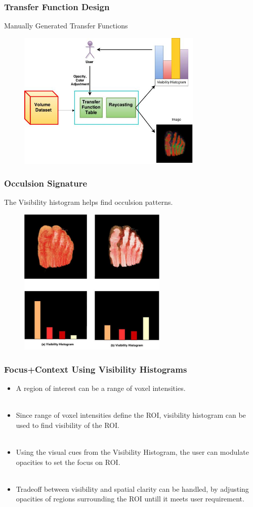 \documentclass{beamer}
\begin{document}
\begin{frame}
\frametitle{Transfer Function Design}
Manually Generated Transfer Functions
\begin{figure}
\centering
\includegraphics[width=250pt]{VH_pipeline.jpg}
\end{figure}
\end{frame}



\begin{frame}
\frametitle{Occulsion Signature}
The Visibility histogram helps find occulsion patterns.
\begin{figure}
\centering
\includegraphics[width=200pt]{occlusion.jpg}
\end{figure}
\end{frame}



\begin{frame}
\frametitle{Focus+Context Using Visibility Histograms}
\begin{itemize}
\item A region of interest can be a range of voxel intensities. \\ $ $
\item Since range of voxel intensities define the ROI, visibility histogram can be used to find visibility of the ROI. \\ $ $
\item Using the visual cues from the Visibility Histogram, the user can modulate opacities to set the focus on ROI.  \\ $ $
\item Tradeoff between visibility and spatial clarity can be handled, by adjusting opacities of regions surrounding the ROI untill it meets user requirement.
\end{itemize}
\end{frame}
\end{document}
